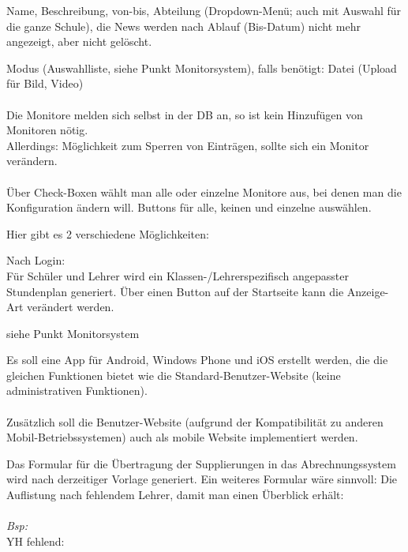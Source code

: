 \begin{description}[style=nextline]
\begin{description}[style=nextline]
		\end{description}
	\item[News]
		Name, Beschreibung, von-bis, Abteilung (Dropdown-Menü; auch mit Auswahl für die ganze Schule), die News werden nach Ablauf (Bis-Datum) nicht mehr angezeigt, aber nicht gelöscht.
	\item[Monitore]
		Modus (Auswahlliste, siehe Punkt Monitorsystem), falls benötigt: Datei (Upload für Bild, Video)\\
		\\
		Die Monitore melden sich selbst in der DB an, so ist kein Hinzufügen von Monitoren nötig. \\
		Allerdings: Möglichkeit zum Sperren von Einträgen, sollte sich ein Monitor verändern.\\
		\\
		Über Check-Boxen wählt man alle oder einzelne Monitore aus, bei denen man die Konfiguration ändern will. Buttons für alle, keinen und einzelne auswählen.
	 \item[Ausgabe]
	 	Hier gibt es 2 verschiedene Möglichkeiten:
	 	\begin{description}[style=nextline]
	 		\item[Benutzer-Website/App]
	 			Nach Login:\\
	 			Für Schüler und Lehrer wird ein Klassen-/Lehrerspezifisch angepasster Stundenplan generiert. Über einen Button auf der Startseite kann die Anzeige-Art verändert werden.
	 		\item[Monitore]
	 			siehe Punkt Monitorsystem
	 	\end{description}
	\item[App]
		Es soll eine App für Android, Windows Phone und iOS erstellt werden, die die gleichen Funktionen bietet wie die Standard-Benutzer-Website (keine administrativen Funktionen).\\
		\\
		Zusätzlich soll die Benutzer-Website (aufgrund der Kompatibilität zu anderen Mobil-Betriebssystemen) auch als mobile Website implementiert werden.
	 \item[Formular]
	 	Das Formular für die Übertragung der Supplierungen in das Abrechnungssystem wird nach derzeitiger Vorlage generiert. Ein weiteres Formular wäre sinnvoll: Die Auflistung nach fehlendem Lehrer, damit man einen Überblick erhält:\\
	 	\\
	 	\textit{Bsp:}\\
	 	YH fehlend:
\begin{tabbing}

\end{tabbing}
\end{description}
